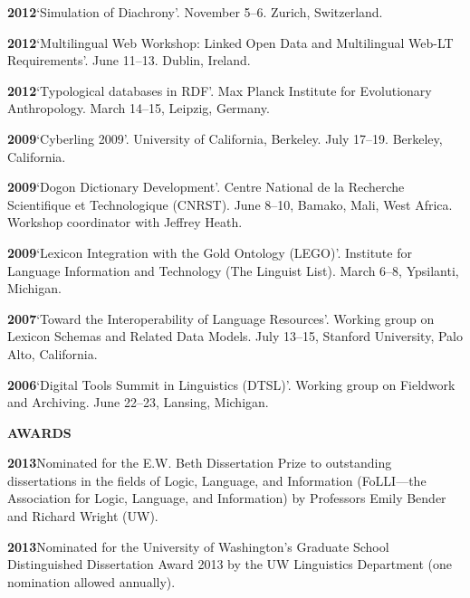 \documentclass[11pt]{article}
\newcommand{\hangpara}{
 \setlength{\parindent}{0in} %
 \hangindent=0.42in %
}
\begin{document}
\vskip 6pt
\hangpara
{\bf 2012}\hspace{1ex}`Simulation of Diachrony'. November 5--6. Zurich, Switzerland.

\vskip 6pt
\hangpara
{\bf 2012}\hspace{1ex}`Multilingual Web Workshop: Linked Open Data and Multilingual Web-LT Requirements'. June 11--13. Dublin, Ireland.

\vskip 6pt
\hangpara
{\bf 2012}\hspace{1ex}`Typological databases in RDF'. Max Planck Institute for Evolutionary Anthropology. March 14--15, Leipzig, Germany. 

\vskip 6pt
\hangpara
{\bf 2009}\hspace{1ex}`Cyberling 2009'. University of California, Berkeley. July 17--19. Berkeley, California.

\vskip 6pt
\hangpara
{\bf 2009}\hspace{1ex}`Dogon Dictionary Development'. Centre National de la Recherche Scientifique et Technologique (CNRST). June 8--10, Bamako, Mali, West Africa. Workshop coordinator with Jeffrey Heath.

\vskip 6pt
\hangpara
{\bf 2009}\hspace{1ex}`Lexicon Integration with the Gold Ontology (LEGO)'. Institute for Language Information and Technology (The Linguist List). March 6--8, Ypsilanti, Michigan.

\vskip 6pt
\hangpara
{\bf 2007}\hspace{1ex}`Toward the Interoperability of Language Resources'. Working group on Lexicon Schemas and Related Data Models. July 13--15, Stanford University, Palo Alto, California.

\vskip 6pt
\hangpara
{\bf 2006}\hspace{1ex}`Digital Tools Summit in Linguistics (DTSL)'. Working group on Fieldwork and Archiving. June 22--23, Lansing, Michigan.


\vskip 20pt
\begin{flushleft}
{\bf AWARDS}
\end{flushleft}

\hangpara
{\bf 2013}\hspace{1ex}Nominated for the E.W. Beth Dissertation Prize to outstanding dissertations in the fields of Logic, Language, and Information (FoLLI---the Association for Logic, Language, and Information) by Professors Emily Bender and Richard Wright (UW).

\vskip 6pt
\hangpara
{\bf 2013}\hspace{1ex}Nominated for the University of Washington's Graduate School Distinguished Dissertation Award 2013 by the UW Linguistics Department (one nomination allowed annually).
\end{document}

